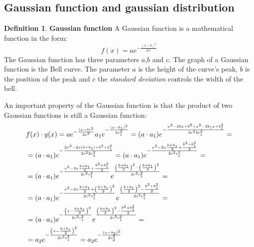 \documentclass[12pt, letterpaper]{article}
\theoremstyle{definition}
\newtheorem{definition}{Definition}[section]
\DeclarePairedDelimiter\autobracket{(}{)}
\newcommand{\br}[1]{\autobracket*{#1}}
\begin{document}
\subsection{Gaussian function and gaussian distribution}
\label{gaussian}
\begin{definition}{\textbf{Gaussian function}}
A Gaussian function is a mathematical function in the form:
\begin{equation}
f(x) = a e^{-\frac{(x-b)^2}{2c^2}}
\end{equation}
The Gaussian function has three parameters $a$,$b$ and $c$. The graph of a Gaussian function is the Bell curve. The parameter $a$ is the height of the curve's peak, $b$ is the position of the peak and $c$ the \textit{standard deviation} controls the width of the bell.

An important property of the Gaussian function is that the product of two Gaussian functions is still a Gaussian function:
\begin{equation}
\label{gauss2}
\begin{aligned}
&f(x) \cdot g(x) = a e^{-\frac{(x-b)^2}{2c^2}} a_1 e^{-\frac{(x-b_1)^2}{2c_1^2}} = (a\cdot a_1) e^{-\frac{x^2-2bx+b^2 + x^2-2b_1x+b_1^2}{2c^2 2c_1^2}}=\\
&= (a\cdot a_1) e^{-\frac{2x^2-2x(b+b_1)+ b^2 +b_1^2}{2c^2 2c_1^2}} = (a\cdot a_1) e^{-\frac{x^2-2x\frac{b +b_1}{2}+ \frac{b^2 +b_1^2}{2}}{2c^2 c_1^2}} = \\
&=(a\cdot a_1) e^{-\frac{x^2-2x\frac{b +b_1}{2}+ \frac{b^2 +b_1^2}{2}}{2c^2 c_1^2}} e^{\frac{\br{\frac{b +b_1}{2}}^2 - \br{\frac{b+b_1}{2}}^2 } {2c^2 c_1^2}}=  \\
&=(a\cdot a_1) e^{-\frac{x^2-2x\frac{b +b_1}{2}+\br{\frac{b +b_1}{2}}^2}{2c^2 c_1^2}} e^{\frac{\br{\frac{b +b_1}{2}}^2 - \frac{b^2 +b_1^2}{2}} {2c^2 c_1^2}} = \\
&=(a\cdot a_1) e^{-\frac{\br{x-\frac{b +b_1}{2}}^2}{2c^2 c_1^2}} e^{\frac{\br{\frac{b +b_1}{2}}^2 - \frac{b^2 +b_1^2}{2}} {2c^2 c_1^2}} = \\
&= a_2 e^{-\frac{\br{x-\frac{b +b_1}{2}}^2}{2c^2 c_1^2}} = a_2 e^{-\frac{\br{x-b_2}^2}{2c_2^2}}
\end{aligned}
\end{equation}
\end{definition}
\end{document}
